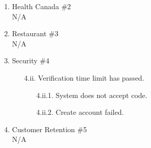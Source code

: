 \documentclass[]{article}
\begin{document}
\begin{enumerate}[{\bf BE1.}]
\begin{enumerate}[{\bf VP1.}]
			\item Health Canada  \#2 \\
				N/A
			\item Restaurant \#3 \\
				N/A
			\item Security \#4 
			\begin{enumerate}
				\item[4.ii.] Verification time limit has passed.
				\begin{enumerate}
					\item[4.ii.1.] System does not accept code.
					\item[4.ii.2.] Create account failed.
				\end{enumerate}
			\end{enumerate}
			\item Customer Retention \#5 \\
				N/A
		\end{enumerate}


\end{enumerate}
\end{document}
